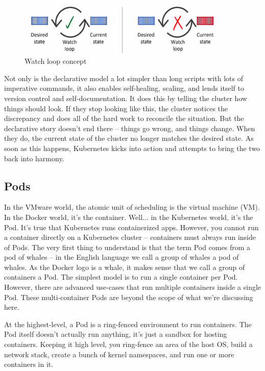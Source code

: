 \documentclass[10pt,a4paper]{report}
\begin{document}
\begin{figure}[h]
	\centering
	\includegraphics[width=0.9\textwidth]{image-K8S-watch-loop}
	\caption{Watch loop concept}
	\label{k8s-watch-loop}
\end{figure} 
Not only is the declarative model a lot simpler than long scripts with lots of imperative commands, it also enables self-healing, scaling, and lends itself to version control and self-documentation. It does this by telling the cluster how things should look. If they stop looking like this, the cluster notices the discrepancy and does all of the hard work to reconcile the situation.
But the declarative story doesn’t end there – things go wrong, and things change. When they do, the current state of the cluster no longer matches the desired state. As soon as this happens, Kubernetes kicks into action and attempts to bring the two back into harmony.

\subsection{Pods}
In the VMware world, the atomic unit of scheduling is the virtual machine (VM). In the Docker world, it’s the container. Well... in the Kubernetes world, it’s the Pod.
It’s true that Kubernetes runs containerized apps. However, you cannot run a container directly on a Kubernetes cluster – containers must always run inside of Pods.
The very first thing to understand is that the term Pod comes from a pod of whales – in the English language we call a group of whales a pod of whales. As the Docker logo is a whale, it makes sense that we call a group of containers a Pod.
The simplest model is to run a single container per Pod. However, there are advanced use-cases that run multiple containers inside a single Pod. These multi-container Pods are beyond the scope of what we’re discussing here.

At the highest-level, a Pod is a ring-fenced environment to run containers. The Pod itself doesn’t actually run anything, it’s just a sandbox for hosting containers. Keeping it high level, you ring-fence an area of the host OS, build a network stack, create a bunch of kernel namespaces, and run one or more containers in it. 
\end{document}
